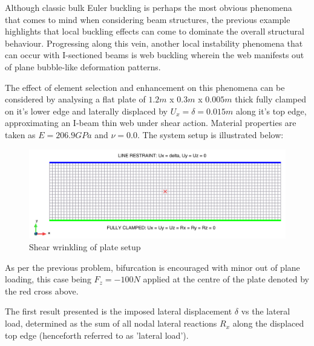 Although classic bulk Euler buckling is perhaps the most obvious phenomena that comes to mind when considering beam structures, the previous example highlights that local buckling effects can come to dominate the overall structural behaviour. Progressing along this vein, another local instability phenomena that can occur with I-sectioned beams is web buckling wherein the web manifests out of plane bubble-like deformation patterns.

The effect of element selection and enhancement on this phenomena can be considered by analysing a flat plate of $1.2m$ x $0.3m$ x $0.005m$ thick fully clamped on it's lower edge and laterally displaced by $U_x = \delta = 0.015m$ along it's top edge, approximating an I-beam thin web under shear action. Material properties are taken as $E = 206.9 GPa$ and $\nu = 0.0$. The system setup is illustrated below:

\begin{figure}[H]
	\centering
	\includegraphics[width=14cm]{images/wrinkle_setup}
	\caption{Shear wrinkling of plate setup}
	\label{fig:wrinklesetup}
\end{figure}

As per the previous problem, bifurcation is encouraged with minor out of plane loading, this case being $F_z = -100N$ applied at the centre of the plate denoted by the red cross above. 

The first result presented is the imposed lateral displacement $\delta$ vs the lateral load, determined as the sum of all nodal lateral reactions $R_x$ along the displaced top edge (henceforth referred to as 'lateral load').

